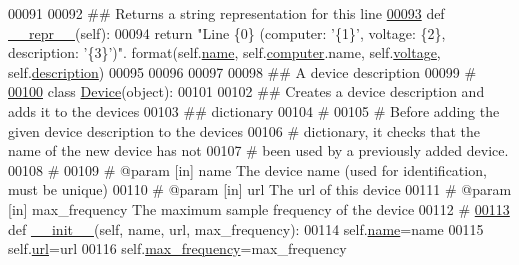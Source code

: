 \begin{DoxyCode}
00091 
00092     \textcolor{comment}{## Returns a string representation for this line}
\hypertarget{settings__classes_8py_source_l00093}{}\hyperlink{classsettings__classes_1_1_p_d_u_line_ad8b9328939df072e4740cd9a63189744}{00093}     \textcolor{keyword}{def }\hyperlink{classsettings__classes_1_1_p_d_u_line_ad8b9328939df072e4740cd9a63189744}{__repr__}(self):
00094         \textcolor{keywordflow}{return} \textcolor{stringliteral}{"Line \{0\} (computer: '\{1\}', voltage: \{2\}, description: '\{3\}')"}.
      format(self.\hyperlink{classsettings__classes_1_1_p_d_u_line_ab74e6bf80237ddc4109968cedc58c151}{name}, self.\hyperlink{classsettings__classes_1_1_p_d_u_line_a98f8cb986fbbcd435b452dc91dc6e8c1}{computer}.name, self.\hyperlink{classsettings__classes_1_1_p_d_u_line_aa1a8261d8fb901476651f1666f993d4b}{voltage}, self.\hyperlink{classsettings__classes_1_1_p_d_u_line_a2661f439a4a94ffdcd5e47ae1da0bb1d}{description})
00095 
00096 
00097 
00098 \textcolor{comment}{## A device description}
00099 \textcolor{comment}{#}
\hypertarget{settings__classes_8py_source_l00100}{}\hyperlink{classsettings__classes_1_1_device}{00100} \textcolor{keyword}{class }\hyperlink{classsettings__classes_1_1_device}{Device}(object):
00101     
00102     \textcolor{comment}{## Creates a device description and adds it to the devices}
00103     \textcolor{comment}{## dictionary}
00104     \textcolor{comment}{#}
00105     \textcolor{comment}{#  Before adding the given device description to the devices}
00106     \textcolor{comment}{#  dictionary, it checks that the name of the new device has not}
00107     \textcolor{comment}{#  been used by a previously added device.}
00108     \textcolor{comment}{#}
00109     \textcolor{comment}{# @param [in] name           The device name (used for identification, must
       be unique)}
00110     \textcolor{comment}{# @param [in] url            The url of this device}
00111     \textcolor{comment}{# @param [in] max\_frequency  The maximum sample frequency of the device}
00112     \textcolor{comment}{#}
\hypertarget{settings__classes_8py_source_l00113}{}\hyperlink{classsettings__classes_1_1_device_afcd5a3e84f2adb7f83fa6c99911f31e4}{00113}     \textcolor{keyword}{def }\hyperlink{classsettings__classes_1_1_device_ac775ee34451fdfa742b318538164070e}{__init__}(self, name, url, max\_frequency):
00114         self.\hyperlink{classsettings__classes_1_1_device_ab74e6bf80237ddc4109968cedc58c151}{name}=name
00115         self.\hyperlink{classsettings__classes_1_1_device_afcd5a3e84f2adb7f83fa6c99911f31e4}{url}=url
00116         self.\hyperlink{classsettings__classes_1_1_device_a22b4066c76c38dbb99a2ef57fc220fb8}{max_frequency}=max\_frequency

\end{DoxyCode}
